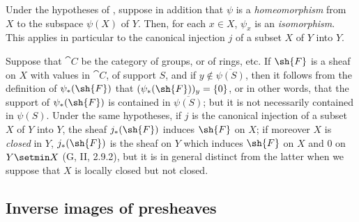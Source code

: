 \begin{env}[3.4.5]
\label{0.3.4.5}
Under the hypotheses of , suppose in addition that $\psi$ is a \emph{homeomorphism} from $X$ to the subspace $\psi(X)$ of $Y$.
Then, for each $x\in X$, $\psi_x$ is an \emph{isomorphism}.
This applies in particular to the canonical injection $j$ of a subset $X$ of $Y$ into $Y$.
\end{env}

\begin{env}[3.4.6]
\label{0.3.4.6}
Suppose that $\cat{C}$ be the category of groups, or of rings, etc. If $\sh{F}$ is a
sheaf on $X$ with values in $\cat{C}$, of support $S$, and if
$y\not\in\overline{\psi(S)}$, then it follows from the definition of
$\psi_*(\sh{F})$ that $(\psi_*(\sh{F}))_y=\{0\}$, or in other words, that the
support of $\psi_*(\sh{F})$ is contained in $\overline{\psi(S)}$; but it is not
necessarily contained in $\psi(S)$. Under the same hypotheses, if $j$ is the
canonical injection of a subset $X$ of $Y$ into $Y$, the sheaf $j_*(\sh{F})$
induces $\sh{F}$ on $X$; if moreover $X$ is \emph{closed} in $Y$, $j_*(\sh{F})$
is the sheaf on $Y$ which induces $\sh{F}$ on $X$ and $0$ on $Y\setmin X$
(G, II, 2.9.2), but it is in general distinct from the latter when we suppose
that $X$ is locally closed but not closed.
\end{env}

\subsection{Inverse images of presheaves}
\label{subsection:0.3.5}

